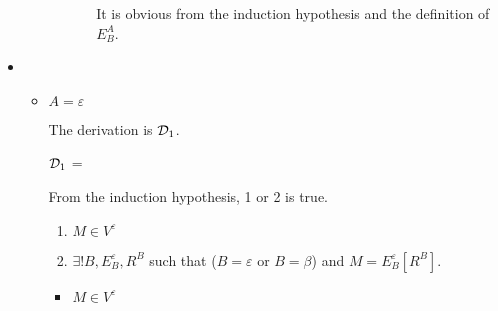 \begin{itemize}
\begin{itemize}
\begin{itemize}
\begin{itemize}
	      	      	      	      It is obvious from the induction hypothesis and the definition of $E^A_B$.
	      	      	      \end{itemize}
	      	      \end{itemize}
	      	      	      	      	      	      	      	      	      	      	      	      		      	      	      	      	      	      	      	      
	      \end{itemize}
	      	      	      	      	      	      		      	      	      	      
	\item \TIns
	      	      	      	      	      	      		      	      	      	      
	      \begin{itemize}
	      	\item $ A = \varepsilon$
	      	      	      	      	      	      	      	      	      	      	      	      		      	      	      	      	      	      	      	      
	      	      The derivation is $\mathcal{D}_1$.
	      	      	      	      	      	      	      	      	      	      	      	      		      	      	      	      	      	      	      	      
	      	      $\mathcal{D}_1$ = 
	      	      {}
	      	      	      	      	      	      	      	      	      	      	      	      		      	      	      	      	      	      	      	      
	      	      From the induction hypothesis, 1 or 2 is true.
	      	      	      	      	      	      	      	      	      	      	      	      		      	      	      	      	      	      	      	      
	      	      \begin{enumerate}
	      	      	\item $ M \in V^\varepsilon$
	      	      	\item $\exists ! B, E^\varepsilon_B, R^B$ such that ($B = \varepsilon$ or $B = \beta$) and $M = E^\varepsilon_B[R^B]$.
	      	      \end{enumerate}
	      	      	      	      	      	      	      	      	      	      	      	      		      	      	      	      	      	      	      	      
	      	      \begin{itemize}
	      	      	\item $ M \in V^\varepsilon$
	      	      	      	      	      	      	      	      	      	      	      	      	      	      	      	      	      	      		      	      	      	      	      	      	      	      	      	      	      	      

\end{itemize}
\end{itemize}
\end{itemize}
